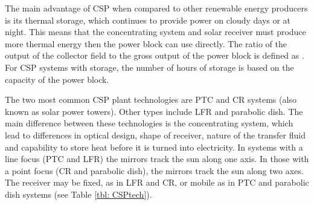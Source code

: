 The main advantage of \ac{CSP} when compared to other renewable energy producers is its thermal storage, which continues to provide power on cloudy days or at night. This means that the concentrating system and solar receiver must produce more thermal energy then the power block can use directly. The ratio of the output of the collector field to the gross output of the power block is defined as . For \ac{CSP} systems with storage, the number of hours of storage is based on the capacity of the power block.

The two most common \ac{CSP} plant technologies are \ac{PTC} and \ac{CR} systems (also known as solar power towers). Other types include \ac{LFR} and parabolic dish. The main difference between these technologies is the concentrating system, which lead to differences in optical design, shape of receiver, nature of the transfer fluid and capability to store heat before it is turned into electricity. In systems with a line focus (\ac{PTC} and \ac{LFR}) the mirrors track the sun along one axis. In those with a point focus (\ac{CR} and parabolic dish), the mirrors track the sun along two axes. The receiver may be fixed, as in \ac{LFR} and \ac{CR}, or mobile as in \ac{PTC} and parabolic dish systems (see Table \ref{tbl: CSPtech}).

